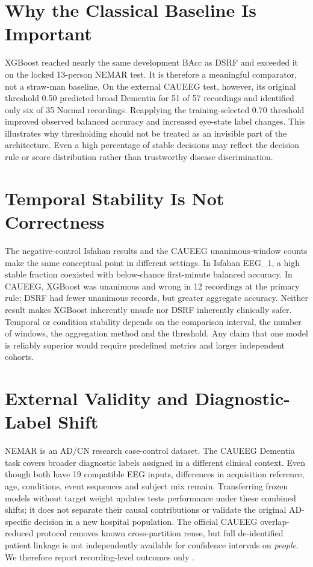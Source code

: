\section{Why the Classical Baseline Is Important}
XGBoost reached nearly the same development BAcc as DSRF and exceeded it on the locked 13-person NEMAR test. It is therefore a meaningful comparator, not a straw-man baseline. On the external CAUEEG test, however, its original threshold 0.50 predicted broad Dementia for 51 of 57 recordings and identified only six of 35 Normal recordings. Reapplying the training-selected 0.70 threshold improved observed balanced accuracy and increased eye-state label changes. This illustrates why thresholding should not be treated as an invisible part of the architecture. Even a high percentage of stable decisions may reflect the decision rule or score distribution rather than trustworthy disease discrimination.

\section{Temporal Stability Is Not Correctness}
The negative-control Isfahan results and the CAUEEG unanimous-window counts make the same conceptual point in different settings. In Isfahan EEG\_1, a high stable fraction coexisted with below-chance first-minute balanced accuracy. In CAUEEG, XGBoost was unanimous and wrong in 12 recordings at the primary rule; DSRF had fewer unanimous records, but greater aggregate accuracy. Neither result makes XGBoost inherently unsafe nor DSRF inherently clinically safer. Temporal or condition stability depends on the comparison interval, the number of windows, the aggregation method and the threshold. Any claim that one model is reliably superior would require predefined metrics and larger independent cohorts.

\section{External Validity and Diagnostic-Label Shift}
NEMAR is an AD/CN research case-control dataset. The CAUEEG Dementia task covers broader diagnostic labels assigned in a different clinical context. Even though both have 19 compatible EEG inputs, differences in acquisition reference, age, conditions, event sequences and subject mix remain. Transferring frozen models without target weight updates tests performance under these combined shifts; it does not separate their causal contributions or validate the original AD-specific decision in a new hospital population. The official CAUEEG overlap-reduced protocol removes known cross-partition reuse, but full de-identified patient linkage is not independently available for confidence intervals on \emph{people}. We therefore report recording-level outcomes only \cite{kim2023caueeg,caueegofficial}.

